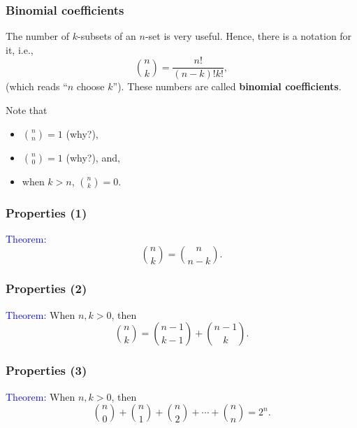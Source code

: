 \begin{frame}\frametitle{Binomial coefficients}
  The number of $k$-subsets of an $n$-set is very useful.  Hence,
  there is a notation for it, i.e.,
  \[
  {n\choose k} = \frac{n!}{(n-k)!k!},
  \]
  (which reads ``$n$ choose $k$'').  These numbers are called {\bf
    binomial coefficients}. \pause

  \vspace{0.1in}
  
  Note that
  \begin{itemize}
  \item ${n\choose n}=1$ (why?), \pause
  \item ${n\choose 0}=1$ (why?), \pause and,
  \item when $k>n$, ${n\choose k}=0$.
  \end{itemize}
\end{frame}

\begin{frame}\frametitle{Properties (1)}
  \textcolor{blue}{Theorem:} $${n\choose k}={n\choose n-k}.$$

  \vspace{2.5in}
\end{frame}

\begin{frame}\frametitle{Properties (2)}
  \textcolor{blue}{Theorem:} When $n,k>0$, then
  $${n\choose k}={n-1\choose k-1} + {n-1\choose k}.$$

  \vspace{2.5in}
\end{frame}

\begin{frame}\frametitle{Properties (3)}
  \textcolor{blue}{Theorem:} When $n,k>0$, then
  $${n\choose 0}+{n\choose 1}+{n\choose 2}+\cdots+{n\choose n}=2^n.$$

  \vspace{2.5in}
\end{frame}
